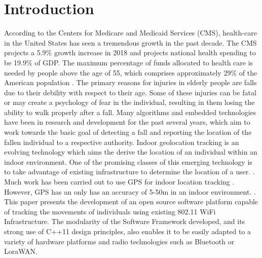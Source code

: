 \documentclass[conference]{IEEEtran}
\begin{document}
\section{Introduction}
\indent According to the Centers for Medicare and Medicaid Services (CMS), health-care in the United States has seen a tremendous growth in the past decade. The CMS projects a 5.9\% growth increase in 2018 and projects national health spending to be 19.9\% of GDP. The maximum percentage of funds allocated to health care is needed by people above the age of 55, which comprises approximately 29\% of the American population \cite{hi}. The primary reasons for injuries in elderly people are falls due to their debility with respect to their age. Some of these injuries can be fatal or may create a psychology of fear in the individual, resulting in them losing the ability to walk properly after a fall. Many algorithms and embedded technologies have been in research and development for the past several years, which aim to work towards the basic goal of detecting a fall and reporting the location of the fallen individual to a respective authority.
\newline  Indoor geolocation tracking is an evolving technology which aims the derive the location of an individual within an indoor environment. One of the promising classes of this emerging technology is to take advantage of existing infrastructure to determine the location of a user. \cite{pahlavan2002indoor}. Much work has been carried out to use GPS for indoor location tracking \cite{kjaergaard2010indoor}. However, GPS has an only has an accuracy of 5-50m in an indoor environment. \cite{liu2007survey}.
\newline \indent This paper presents the development of an open source software platform capable of tracking the movements of individuals using existing 802.11 WiFi Infrastructure. The modularity of the Software Framework developed, and its strong use of C++11 design principles, also enables it to be easily adapted to a variety of hardware platforms and radio technologies such as Bluetooth or LoraWAN.
\end{document}

